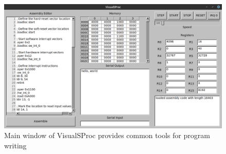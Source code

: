 \documentclass{article}
\begin{document}
\begin{figure}[h!]
	\centering
	\includegraphics[width=5in]{images/visual-sproc.png}
	\caption{Main window of VisualSProc provides common tools for program writing}
	\label{fig:visual-sproc-main-page}
\end{figure}
\end{document}
